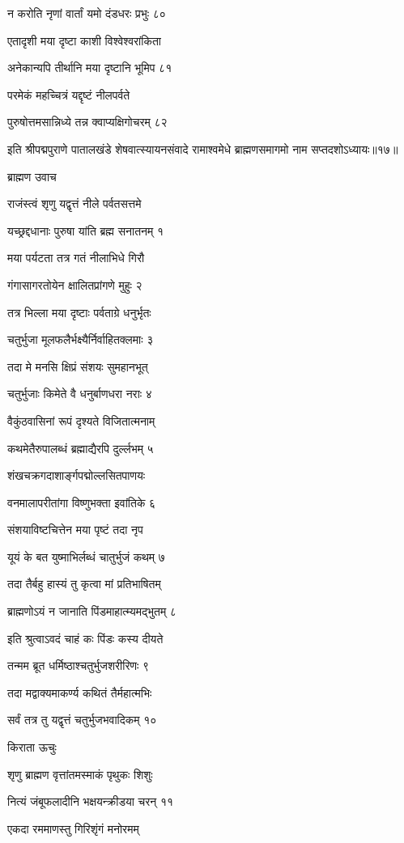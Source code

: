 न करोति नृणां वार्तां यमो दंडधरः प्रभुः ८०

एतादृशी मया दृष्टा काशी विश्वेश्वरांकिता

अनेकान्यपि तीर्थानि मया दृष्टानि भूमिप ८१

परमेकं महच्चित्रं यद्दृष्टं नीलपर्वते

पुरुषोत्तमसान्निध्ये तन्न क्वाप्यक्षिगोचरम् ८२

इति श्रीपद्मपुराणे पातालखंडे शेषवात्स्यायनसंवादे रामाश्वमेधे ब्राह्मणसमागमो नाम सप्तदशोऽध्यायः॥१७॥


ब्राह्मण उवाच

राजंस्त्वं शृणु यद्वृत्तं नीले पर्वतसत्तमे

यच्छ्रद्दधानाः पुरुषा यांति ब्रह्म सनातनम् १

मया पर्यटता तत्र गतं नीलाभिधे गिरौ

गंगासागरतोयेन क्षालितप्रांगणे मुहुः २

तत्र भिल्ला मया दृष्टाः पर्वताग्रे धनुर्भृतः

चतुर्भुजा मूलफलैर्भक्ष्यैर्निर्वाहितक्लमाः ३

तदा मे मनसि क्षिप्रं संशयः सुमहानभूत्

चतुर्भुजाः किमेते वै धनुर्बाणधरा नराः ४

वैकुंठवासिनां रूपं दृश्यते विजितात्मनाम्

कथमेतैरुपालब्धं ब्रह्माद्यैरपि दुर्ल्लभम् ५

शंखचक्रगदाशार्ङ्गपद्मोल्लसितपाणयः

वनमालापरीतांगा विष्णुभक्ता इवांतिके ६

संशयाविष्टचित्तेन मया पृष्टं तदा नृप

यूयं के बत युष्माभिर्लब्धं चातुर्भुजं कथम् ७

तदा तैर्बहु हास्यं तु कृत्वा मां प्रतिभाषितम्

ब्राह्मणोऽयं न जानाति पिंडमाहात्म्यमद्भुतम् ८

इति श्रुत्वाऽवदं चाहं कः पिंडः कस्य दीयते

तन्मम ब्रूत धर्मिष्ठाश्चतुर्भुजशरीरिणः ९

तदा मद्वाक्यमाकर्ण्य कथितं तैर्महात्मभिः

सर्वं तत्र तु यद्वृत्तं चतुर्भुजभवादिकम् १०

किराता ऊचुः

शृणु ब्राह्मण वृत्तांतमस्माकं पृथुकः शिशुः

नित्यं जंबूफलादीनि भक्षयन्क्रीडया चरन् ११

एकदा रममाणस्तु गिरिशृंगं मनोरमम्

